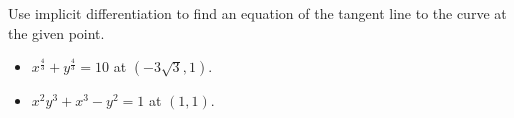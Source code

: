 Use implicit differentiation to find an equation of the tangent line to the curve at the given point.
\begin{itemize}
\item $x^{\frac{4}{3}}+y^{\frac{4}{3}}=10$ at $(-3\sqrt{3}, 1)$. 
\item $x^2y^3+x^3-y^2=1$ at $(1,1)$. 
\end{itemize}
